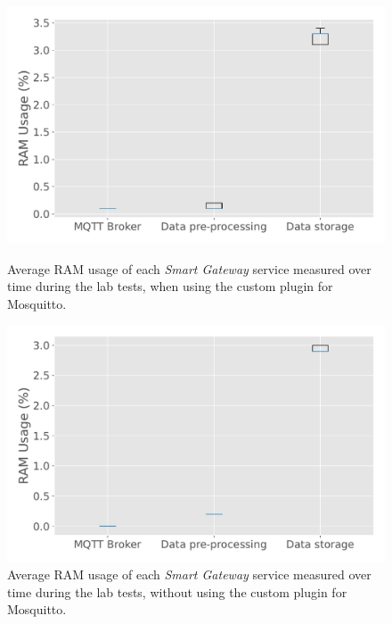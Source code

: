 \begin{figure}[H]
    \begin{minipage}{0.45\linewidth}
        \centering
        \includegraphics[width=\linewidth]{images/labtest_ram_usage_with_plugin.pdf}
        \caption{Average \acs{RAM} usage of each \textit{Smart Gateway} service measured over time during the lab tests, when using the custom plugin for Mosquitto.}
        \label{fig:labtest-ram-usage}
    \end{minipage}
    \hspace{0.05\linewidth}
    \begin{minipage}{0.45\linewidth}
        \centering
        \includegraphics[width=\linewidth]{images/labtest_ram_usage_without_plugin.pdf}
        \caption{Average \acs{RAM} usage of each \textit{Smart Gateway} service measured over time during the lab tests, without using the custom plugin for Mosquitto.}
        \label{fig:labtest-ram-usage-noplug}
    \end{minipage}
\end{figure}


